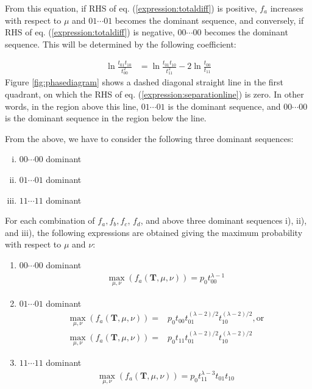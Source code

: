 ﻿\documentclass[a3paper,xelatex,english]{bxjsarticle}
\newcommand\mib[1]{\boldsymbol{#1}}
\begin{document}
From this equation, if RHS of eq. (\ref{expression:totaldiff}) is positive, $f_{a}$ increases with respect to $\mu$ and $01 \cdots 01$ becomes the dominant sequence, and conversely, if RHS of eq. (\ref{expression:totaldiff}) is negative, $00 \cdots 00$ becomes the dominant sequence.
This will be determined by the following coefficient:

\begin{align}
	\ln \frac{t_{01}t_{10}}{t_{00}^{2}} 
	&= 
	\ln \frac{t_{01}t_{10}}{t_{11}^{2}} - 2 \ln \frac{t_{00}}{t_{11}}
	\label{expression:separationline}
\end{align}
Figure \ref{fig:phasediagram} shows a dashed diagonal straight line in the first quadrant, on which the RHS of eq. (\ref{expression:separationline}) is zero.  
In other words, in the region above this line, $01 \cdots 01$ is the dominant sequence, and $00 \cdots 00$ is the dominant sequence in the region below the line. 


From the above, we have to consider the following three dominant sequences:
\begin{enumerate}[i)]
	\item $00 \cdots 00$ dominant 
	\item $01 \cdots 01$ dominant 
	\item $11 \cdots 11$ dominant 
\end{enumerate}

\clearpage

For each combination of $f_a, f_b, f_c$, $f_d$, and above three dominant sequences i), ii), and iii), 
the following expressions are obtained giving the maximum probability with respect to $\mu$ and $\nu$:

\begin{enumerate}[{a)}-i)]
	\item $00 \cdots 00$ dominant 
	\begin{align}
	\max_{\mu, \nu}(f_{a}(\mib{T}, \mu, \nu)) = p_{0} t_{00}^{\lambda - 1}
	\end{align}
	\item $01 \cdots 01$ dominant 
	\begin{align}
	\max_{\mu, \nu}(f_{a}(\mib{T}, \mu, \nu)) = & p_{0} t_{00} t_{01}^{(\lambda - 2) / 2} t_{10}^{(\lambda - 2) / 2}, {\textrm{or}} \\
	\max_{\mu, \nu}(f_{a}(\mib{T}, \mu, \nu)) = & p_{0} t_{11} t_{01}^{(\lambda - 2) / 2} t_{10}^{(\lambda - 2) / 2}
	\end{align}
	\item $11 \cdots 11$ dominant 
	\begin{align}
	\max_{\mu, \nu}(f_{a}(\mib{T}, \mu, \nu)) = p_{0} t_{11}^{\lambda - 3} t_{01} t_{10} \label{expression:neg1}
	\end{align}
\end{enumerate}
\end{document}
